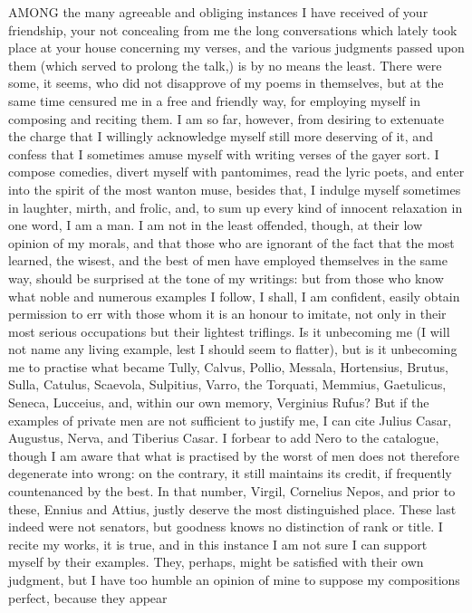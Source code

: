 AMONG the many agreeable and obliging instances I have received of your
friendship, your not concealing from me the long conversations which
lately took place at your house concerning my verses, and the various
judgments passed upon them (which served to prolong the talk,) is by no
means the least. There were some, it seems, who did not disapprove of my
poems in themselves, but at the same time censured me in a free and
friendly way, for employing myself in composing and reciting them. I am so
far, however, from desiring to extenuate the charge that I willingly
acknowledge myself still more deserving of it, and confess that I
sometimes amuse myself with writing verses of the gayer sort. I compose
comedies, divert myself with pantomimes, read the lyric poets, and enter
into the spirit of the most wanton muse, besides that, I indulge myself
sometimes in laughter, mirth, and frolic, and, to sum up every kind of
innocent relaxation in one word, I am a man. I am not in the least
offended, though, at their low opinion of my morals, and that those who
are ignorant of the fact that the most learned, the wisest, and the best
of men have employed themselves in the same way, should be surprised at
the tone of my writings: but from those who know what noble and numerous
examples I follow, I shall, I am confident, easily obtain permission to
err with those whom it is an honour to imitate, not only in their most
serious occupations but their lightest triflings. Is it unbecoming me (I
will not name any living example, lest I should seem to flatter), but is
it unbecoming me to practise what became Tully, Calvus, Pollio, Messala,
Hortensius, Brutus, Sulla, Catulus, Scaevola, Sulpitius, Varro, the
Torquati, Memmius, Gaetulicus, Seneca, Lucceius, and, within our own
memory, Verginius Rufus? But if the examples of private men are not
sufficient to justify me, I can cite Julius Casar, Augustus, Nerva, and
Tiberius Casar. I forbear to add Nero to the catalogue, though I am aware
that what is practised by the worst of men does not therefore degenerate
into wrong: on the contrary, it still maintains its credit, if frequently
countenanced by the best. In that number, Virgil, Cornelius Nepos, and
prior to these, Ennius and Attius, justly deserve the most distinguished
place. These last indeed were not senators, but goodness knows no
distinction of rank or title. I recite my works, it is true, and in this
instance I am not sure I can support myself by their examples. They,
perhaps, might be satisfied with their own judgment, but I have too humble
an opinion of mine to suppose my compositions perfect, because they appear
